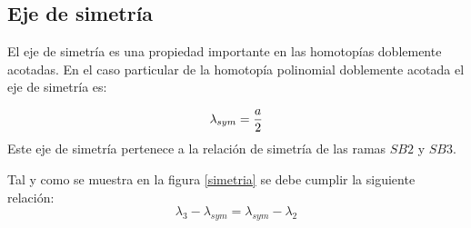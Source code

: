 \documentclass[conference,letterpaper,onecolumn]{IEEEtran}
\begin{document}
\begin{table}[tbp]
\caption{Ramas sim\'etricas}
\label{ramasx}
\end{table} 


\subsection{Eje de simetr\'ia}

El eje de simetr{\'i}a es una propiedad importante en las homotop{\'i}as doblemente acotadas. En el 
caso particular de la homotop{\'i}a polinomial doblemente acotada el eje de simetr{\'i}a es:

\begin{equation}
\lambda_{sym}= {a \over 2}
\label{sym}
\end{equation}
Este eje de simetr{\'i}a pertenece a la relaci\'on de simetr{\'i}a de las ramas $SB2$ y $SB3$.


Tal y como se muestra en la figura \ref{simetria} se debe cumplir la siguiente relaci\'on:
\begin{displaymath}
\lambda_3-\lambda_{sym}=\lambda_{sym} -\lambda_2
\end{displaymath}
\end{document}
